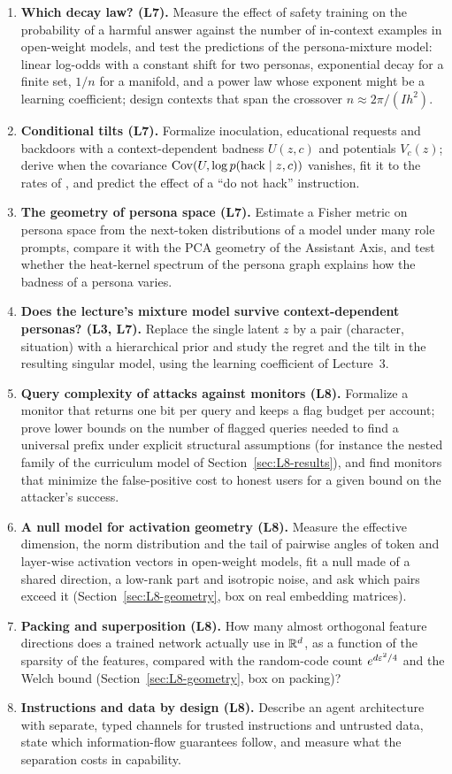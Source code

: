\begin{enumerate}
\item \textbf{Which decay law? (L7).} Measure the effect of safety training on the probability of a harmful answer against the number of in-context examples in open-weight models, and test the predictions of the persona-mixture model: linear log-odds with a constant shift for two personas, exponential decay for a finite set, $1/n$ for a manifold, and a power law whose exponent might be a learning coefficient; design contexts that span the crossover $n\approx2\pi/(Ih^2)$.
\item \textbf{Conditional tilts (L7).} Formalize inoculation, educational requests and backdoors with a context-dependent badness $U(z,c)$ and potentials $V_c(z)$; derive when the covariance $\operatorname{Cov}(U,\log p(\mathrm{hack}\mid z,c))$ vanishes, fit it to the rates of \citet{macdiarmid2025}, and predict the effect of a ``do not hack'' instruction.
\item \textbf{The geometry of persona space (L7).} Estimate a Fisher metric on persona space from the next-token distributions of a model under many role prompts, compare it with the PCA geometry of the Assistant Axis, and test whether the heat-kernel spectrum of the persona graph explains how the badness of a persona varies.
\item \textbf{Does the lecture's mixture model survive context-dependent personas? (L3, L7).} Replace the single latent $z$ by a pair (character, situation) with a hierarchical prior and study the regret and the tilt in the resulting singular model, using the learning coefficient of Lecture~3.

  \item \textbf{Query complexity of attacks against monitors (L8).} Formalize a monitor that returns one bit per query and keeps a flag budget per account; prove lower bounds on the number of flagged queries needed to find a universal prefix under explicit structural assumptions (for instance the nested family of the curriculum model of Section~\ref{sec:L8-results}), and find monitors that minimize the false-positive cost to honest users for a given bound on the attacker's success.
  \item \textbf{A null model for activation geometry (L8).} Measure the effective dimension, the norm distribution and the tail of pairwise angles of token and layer-wise activation vectors in open-weight models, fit a null made of a shared direction, a low-rank part and isotropic noise, and ask which pairs exceed it (Section~\ref{sec:L8-geometry}, box on real embedding matrices).
  \item \textbf{Packing and superposition (L8).} How many almost orthogonal feature directions does a trained network actually use in $\mathbb{R}^d$, as a function of the sparsity of the features, compared with the random-code count $e^{d\varepsilon^2/4}$ and the Welch bound (Section~\ref{sec:L8-geometry}, box on packing)?
  \item \textbf{Instructions and data by design (L8).} Describe an agent architecture with separate, typed channels for trusted instructions and untrusted data, state which information-flow guarantees follow, and measure what the separation costs in capability.

\end{enumerate}
